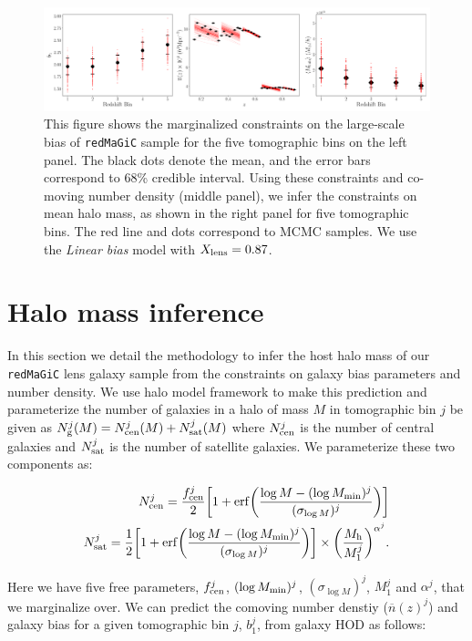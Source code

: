 \documentclass[aps, prd,twocolumn,superscriptaddress,nofootinbib,preprintnumbers]{revtex4-1}
\newcommand{\redmagic}{\texttt{redMaGiC} }
\begin{document}

\begin{figure}
\includegraphics[width=\textwidth]{figs/b1_nbar_Mh_sim_marg_wcov.pdf}
\caption[]{This figure shows the marginalized constraints on the large-scale bias of \redmagic sample for the five tomographic bins on the left panel. The black dots denote the mean, and the error bars correspond to 68\% credible interval. Using these constraints and co-moving number density (middle panel), we infer the constraints on mean halo mass, as shown in the right panel for five tomographic bins. The red line and dots correspond to MCMC samples. We use the \textit{Linear bias} model with $X_{\rm lens}=0.87$.  }
\label{fig:b1_nbar_Mh}
\end{figure}

\section{Halo mass inference}
\label{app:halo_mass}
In this section we detail the methodology to infer the host halo mass of our \redmagic lens galaxy sample from the constraints on galaxy bias parameters and number density. We use halo model framework to make this prediction and parameterize the number of galaxies in a halo of mass $M$ in tomographic bin $j$ be given as $N^{j}_{\rm g}(M) = N^{j}_{\rm{cen}}(M) + N^{j}_{\rm{sat}}(M)$ where $N^{j}_{\rm{cen}}$ is the number of central galaxies and $N^{j}_{\rm{sat}}$ is the number of satellite galaxies. We parameterize these two components as:
\begin{linenomath*}
\begin{align}
    N^{j}_{\rm cen} =  \frac{f^{j}_{\rm cen}}{2} \bigg[1 + {\rm erf}\bigg(\frac{ \log{M} - (\log{M_{\rm min}})^j}{(\sigma_{\log{M}})^j} \bigg) \bigg]  \\
    N^j_{\rm sat} = \frac{1}{2} \bigg[1 + {\rm erf}\bigg(\frac{ \log{M} - (\log{M_{\rm min}})^j}{(\sigma_{\log{M}})^j} \bigg) \bigg] \times \bigg( \frac{M_{\rm h}}{M^j_1} \bigg)^{\alpha^j}.
\end{align}
\end{linenomath*}
Here we have five free parameters, $f^j_{\rm cen}$, $(\log{M_{\rm min}})^j$, $(\sigma_{\log{M}})^j$, $M^j_1$ and $\alpha^j$, that we marginalize over. We can predict the comoving number denstiy ($\overline{n}(z)^j$) and galaxy bias for a given tomographic bin $j$, $b^j_1$, from galaxy HOD as follows:
\end{document}
